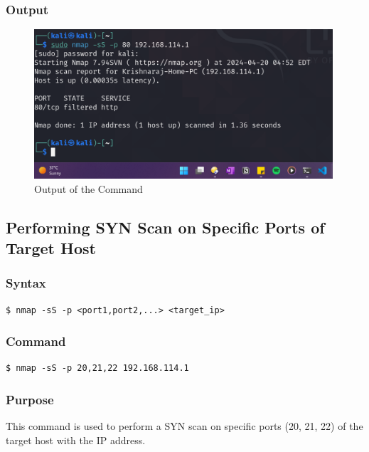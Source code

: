 \documentclass[11pt]{article}
\begin{document}
\subsubsection*{Output}
\begin{figure}[H]
    \centering
    \includegraphics[width=0.99\textwidth]{a3_ss (5).png}
    \caption{Output of the Command}
\end{figure}

\subsection{Performing SYN Scan on Specific Ports of Target Host}

\subsubsection*{Syntax}
\begin{verbatim}
$ nmap -sS -p <port1,port2,...> <target_ip>
\end{verbatim}

\subsubsection*{Command}
\begin{verbatim}
$ nmap -sS -p 20,21,22 192.168.114.1
\end{verbatim}

\subsubsection*{Purpose}
This command is used to perform a SYN scan on specific ports (20, 21, 22) of the target host with the IP address.
\end{document}
